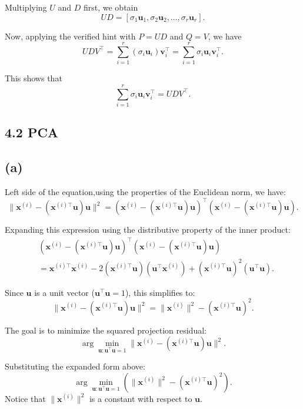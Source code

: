 \documentclass[12pt]{article}
\begin{document}
Multiplying \( U \) and \( D \) first, we obtain
\[
U D = \left[ \sigma_1 \mathbf{u}_1, \sigma_2 \mathbf{u}_2, \ldots, \sigma_r \mathbf{u}_r \right].
\]

Now, applying the verified hint with \( P = U D \) and \( Q = V \), we have
\[
U D V^\top = \sum_{i=1}^r (\sigma_i \mathbf{u}_i) \mathbf{v}_i^\top = \sum_{i=1}^r \sigma_i \mathbf{u}_i \mathbf{v}_i^\top.
\]

This shows that
\[
\sum_{i=1}^r \sigma_i \mathbf{u}_i \mathbf{v}_i^\top = U D V^\top.
\]

\subsection*{4.2 PCA}

\subsection*{(a)}

Left side of the equation,using the properties of the Euclidean norm, we have:
\[
\|\mathbf{x}^{(i)} - (\mathbf{x}^{(i)\top} \mathbf{u})\mathbf{u}\|^2 = \left( \mathbf{x}^{(i)} - (\mathbf{x}^{(i)\top} \mathbf{u})\mathbf{u} \right)^\top \left( \mathbf{x}^{(i)} - (\mathbf{x}^{(i)\top} \mathbf{u})\mathbf{u} \right).
\]

Expanding this expression using the distributive property of the inner product:
\[
\begin{aligned}
&\left( \mathbf{x}^{(i)} - (\mathbf{x}^{(i)\top} \mathbf{u})\mathbf{u} \right)^\top \left( \mathbf{x}^{(i)} - (\mathbf{x}^{(i)\top} \mathbf{u})\mathbf{u} \right) \\
&= \mathbf{x}^{(i)\top} \mathbf{x}^{(i)} - 2 (\mathbf{x}^{(i)\top} \mathbf{u})(\mathbf{u}^\top \mathbf{x}^{(i)}) + (\mathbf{x}^{(i)\top} \mathbf{u})^2 (\mathbf{u}^\top \mathbf{u}).
\end{aligned}
\]

Since \( \mathbf{u} \) is a unit vector (\( \mathbf{u}^\top \mathbf{u} = 1 \)), this simplifies to:
\[
\|\mathbf{x}^{(i)} - (\mathbf{x}^{(i)\top} \mathbf{u})\mathbf{u}\|^2 = \|\mathbf{x}^{(i)}\|^2 - (\mathbf{x}^{(i)\top} \mathbf{u})^2.
\]

The goal is to minimize the squared projection residual:
\[
\arg\min_{\mathbf{u}: \mathbf{u}^\top \mathbf{u} = 1} \|\mathbf{x}^{(i)} - (\mathbf{x}^{(i)\top} \mathbf{u})\mathbf{u}\|^2.
\]

Substituting the expanded form above:
\[
\arg\min_{\mathbf{u}: \mathbf{u}^\top \mathbf{u} = 1} \left( \|\mathbf{x}^{(i)}\|^2 - (\mathbf{x}^{(i)\top} \mathbf{u})^2 \right).
\]
Notice that \( \|\mathbf{x}^{(i)}\|^2 \) is a constant with respect to \( \mathbf{u} \). 
\end{document}
